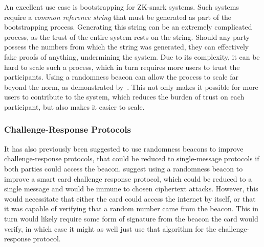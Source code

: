An excellent use case is bootstrapping for ZK-snark systems. Such systems require a \emph{common reference string} that must be generated as part of the bootstrapping process. Generating this string can be an extremely complicated process, as the trust of the entire system rests on the string. Should any party possess the numbers from which the string was generated, they can effectively fake proofs of anything, undermining the system. Due to its complexity, it can be hard to scale such a process, which in turn requires more users to trust the participants. Using a randomness beacon can allow the process to scale far beyond the norm, as demonstrated by~\citet{mpcsnarks}. This not only makes it possible for more users to contribute to the system, which reduces the burden of trust on each participant, but also makes it easier to scale.

\subsubsection{Challenge-Response Protocols}
It has also previously been suggested to use randomness beacons to improve challenge-response protocols, that could be reduced to single-message protocols if both parties could access the beacon.
\citet{fischer2011publicrandomnessservice} suggest using a randomness beacon to improve a smart card challenge response protocol, which could be reduced to a single message and would be immune to chosen ciphertext attacks. However, this would necessitate that either the card could access the internet by itself, or that it was capable of verifying that a random number came from the beacon. This in turn would likely require some form of signature from the beacon the card would verify, in which case it might as well just use that algorithm for the challenge-response protocol. %





